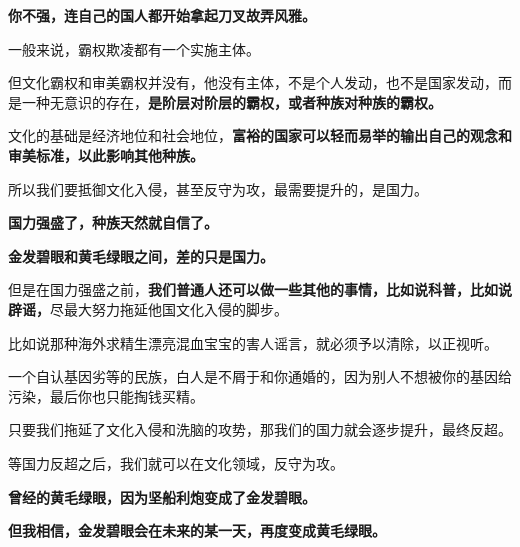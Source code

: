 \documentclass[UTF8, 11pt, oneside]{ctexart}
\newcommand{\zd}[1]{\textbf{\textcolor[RGB]{123,12,0}{#1}}} %
\begin{document}
\zd{你不强，连自己的国人都开始拿起刀叉故弄风雅。}

一般来说，霸权欺凌都有一个实施主体。

但文化霸权和审美霸权并没有，他没有主体，不是个人发动，也不是国家发动，而是一种无意识的存在，\zd{是阶层对阶层的霸权，或者种族对种族的霸权。}

文化的基础是经济地位和社会地位，\zd{富裕的国家可以轻而易举的输出自己的观念和审美标准，以此影响其他种族。}

所以我们要抵御文化入侵，甚至反守为攻，最需要提升的，是国力。

\zd{国力强盛了，种族天然就自信了。}

\zd{金发碧眼和黄毛绿眼之间，差的只是国力。}

但是在国力强盛之前，\zd{我们普通人还可以做一些其他的事情，比如说科普，比如说辟谣，}尽最大努力拖延他国文化入侵的脚步。

比如说那种海外求精生漂亮混血宝宝的害人谣言，就必须予以清除，以正视听。

一个自认基因劣等的民族，白人是不屑于和你通婚的，因为别人不想被你的基因给污染，最后你也只能掏钱买精。

只要我们拖延了文化入侵和洗脑的攻势，那我们的国力就会逐步提升，最终反超。

等国力反超之后，我们就可以在文化领域，反守为攻。

\zd{曾经的黄毛绿眼，因为坚船利炮变成了金发碧眼。}

\zd{但我相信，金发碧眼会在未来的某一天，再度变成黄毛绿眼。}
\end{document}
